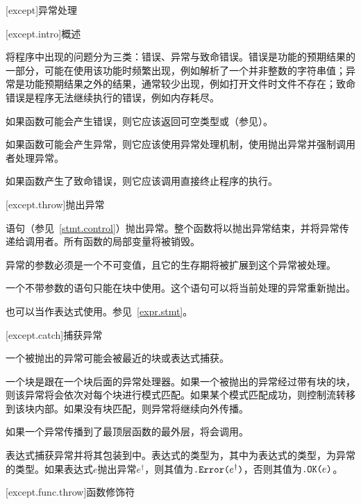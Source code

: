 
[except]{异常处理}

[except.intro]{概述}

\pnum
\X 将程序中出现的问题分为三类：错误、异常与致命错误。错误是功能的预期结果的一部分，可能在使用该功能时频繁出现，例如解析了一个并非整数的字符串值；异常是功能预期结果之外的结果，通常较少出现，例如打开文件时文件不存在；致命错误是程序无法继续执行的错误，例如内存耗尽。

\pnum
如果函数可能会产生错误，则它应该返回可空类型或（参见）。

\pnum
如果函数可能会产生异常，则它应该使用异常处理机制，使用抛出异常并强制调用者处理异常。

\pnum
如果函数产生了致命错误，则它应该调用直接终止程序的执行。

[except.throw]{抛出异常}

\pnum
{}语句（参见~\ref{stmt.control}）抛出异常。整个函数将以抛出异常结束，并将异常传递给调用者。所有函数的局部变量将被销毁。

\pnum
异常的参数必须是一个不可变值，且它的生存期将被扩展到这个异常被处理。

\pnum
一个不带参数的语句只能在块中使用。这个语句可以将当前处理的异常重新抛出。

\pnum
{}也可以当作表达式使用。参见~\ref{expr.stmt}。

[except.catch]{捕获异常}

\pnum
一个被抛出的异常可能会被最近的块或表达式捕获。

\pnum
一个块是跟在一个块后面的异常处理器。如果一个被抛出的异常经过带有块的块，则该异常将会依次对每个块进行模式匹配。如果某个模式匹配成功，则控制流转移到该块内部。如果没有块匹配，则异常将继续向外传播。

\pnum
如果一个异常传播到了最顶层函数的最外层，将会调用。

\pnum
{}表达式捕获异常并将其包装到中。表达式的类型为，其中为表达式的类型，为异常的类型。如果表达式$e$抛出异常$e^\dagger$，则其值为$\texttt{.Error(}e^\dagger\texttt{)}$，否则其值为$\texttt{.OK(}e\texttt{)}$。

[except.func.throw]{函数修饰符}

